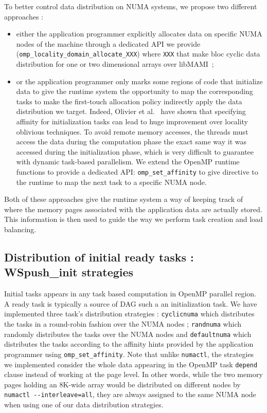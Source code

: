 \documentclass{Styles/llncs}
\begin{document}
To better control data distribution on NUMA systems, we propose two different approaches :
\begin{itemize}
\item either the application programmer explicitly allocates data on specific NUMA nodes of the machine through a dedicated API we provide~\cite{Durand2013} (\verb!omp_locality_domain_allocate_XXX!) where \verb!XXX! that make bloc cyclic data distribution for one or two dimensional arrays over libMAMI~\cite{mami};
\item or the application programmer only marks some regions of code that initialize data to give the runtime system the opportunity to map the corresponding tasks to make the first-touch allocation policy indirectly apply the data distribution we target. Indeed, Olivier et al.~\cite{Olivier:2012:CMW:2388996.2389085}
have shown that specifying affinity for initialization tasks can lead to huge improvement over locality oblivious techniques.
To avoid remote memory accesses, the threads must access the data during the computation phase the exact same way it was accessed during the initialization phase, which is very difficult to guarantee with dynamic task-based parallelism. We extend the OpenMP runtime functions to provide a dedicated API: \verb!omp_set_affinity! to give directive to the runtime to map the next task to a specific NUMA node.
\end{itemize}
Both of these approaches give the runtime system a way of keeping track of where the memory pages associated with the application data are actually stored.
This information is then used to guide the way we perform task creation and load balancing.

\subsection{Distribution of initial ready tasks : WSpush\_init strategies}
Initial tasks appears in any task based computation in OpenMP parallel region. A ready task is typically a source of DAG such a an initialization task.
We have implemented three task's distribution strategies : \verb!cyclicnuma! which distributes the tasks in a round-robin fashion over the NUMA nodes ; \verb!randnuma! which randomly distributes the tasks over the NUMA nodes and \verb!defaultnuma! which distributes the tasks according to the affinity hints provided by the application programmer using \verb!omp_set_affinity!.
Note that unlike \verb!numactl!, the strategies we implemented consider the whole data appearing in the OpenMP task \verb!depend! clause instead of working at the page level. In other words, while the two memory pages holding an 8K-wide array would be distributed on different nodes by \verb!numactl --interleave=all!, they are always assigned to the same NUMA node when using one of our data distribution strategies.
\end{document}
